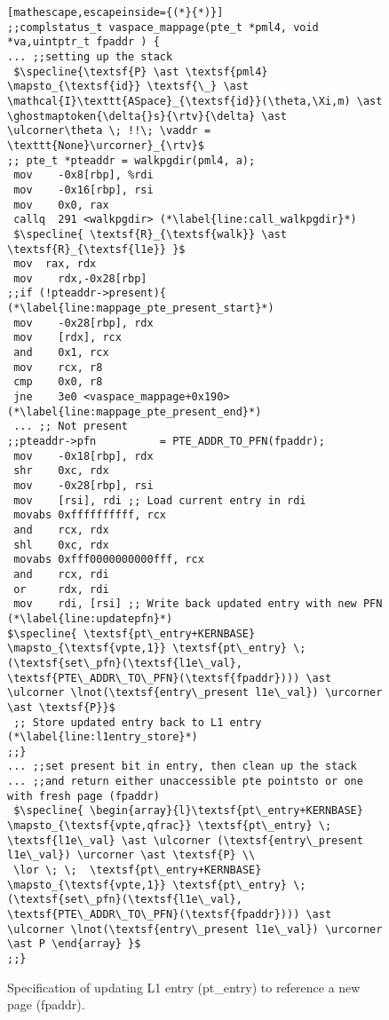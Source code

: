 \begin{figure}\footnotesize
  \begin{lstlisting}[mathescape,escapeinside={(*}{*)}]
;;complstatus_t vaspace_mappage(pte_t *pml4, void *va,uintptr_t fpaddr ) {
... ;;setting up the stack      
 $\specline{\textsf{P} \ast \textsf{pml4} \mapsto_{\textsf{id}} \textsf{\_} \ast \mathcal{I}\texttt{ASpace}_{\textsf{id}}(\theta,\Xi,m) \ast \ghostmaptoken{\delta{}s}{\rtv}{\delta} \ast \ulcorner\theta \; !!\; \vaddr = \texttt{None}\urcorner}_{\rtv}$      
;; pte_t *pteaddr = walkpgdir(pml4, a);
 mov    -0x8[rbp], %rdi
 mov    -0x16[rbp], rsi
 mov    0x0, rax
 callq  291 <walkpgdir> (*\label{line:call_walkpgdir}*)
 $\specline{ \textsf{R}_{\textsf{walk}} \ast \textsf{R}_{\textsf{l1e}} }$
 mov  rax, rdx
 mov    rdx,-0x28[rbp]
;;if (!pteaddr->present){ (*\label{line:mappage_pte_present_start}*)
 mov    -0x28[rbp], rdx
 mov    [rdx], rcx
 and    0x1, rcx
 mov    rcx, r8
 cmp    0x0, r8
 jne    3e0 <vaspace_mappage+0x190> (*\label{line:mappage_pte_present_end}*)
 ... ;; Not present
;;pteaddr->pfn          = PTE_ADDR_TO_PFN(fpaddr);
 mov    -0x18[rbp], rdx
 shr    0xc, rdx
 mov    -0x28[rbp], rsi
 mov    [rsi], rdi ;; Load current entry in rdi
 movabs 0xffffffffff, rcx
 and    rcx, rdx
 shl    0xc, rdx
 movabs 0xfff0000000000fff, rcx
 and    rcx, rdi
 or     rdx, rdi
 mov    rdi, [rsi] ;; Write back updated entry with new PFN (*\label{line:updatepfn}*)
$\specline{ \textsf{pt\_entry+KERNBASE} \mapsto_{\textsf{vpte,1}} \textsf{pt\_entry} \; (\textsf{set\_pfn}(\textsf{l1e\_val}, \textsf{PTE\_ADDR\_TO\_PFN}(\textsf{fpaddr}))) \ast  \ulcorner \lnot(\textsf{entry\_present l1e\_val}) \urcorner \ast \textsf{P}}$
 ;; Store updated entry back to L1 entry (*\label{line:l1entry_store}*)
;;}
... ;;set present bit in entry, then clean up the stack
... ;;and return either unaccessible pte pointsto or one with fresh page (fpaddr)
 $\specline{ \begin{array}{l}\textsf{pt\_entry+KERNBASE} \mapsto_{\textsf{vpte,qfrac}} \textsf{pt\_entry} \; \textsf{l1e\_val} \ast \ulcorner (\textsf{entry\_present l1e\_val}) \urcorner \ast \textsf{P} \\
 \lor \; \;  \textsf{pt\_entry+KERNBASE} \mapsto_{\textsf{vpte,1}} \textsf{pt\_entry} \; (\textsf{set\_pfn}(\textsf{l1e\_val}, \textsf{PTE\_ADDR\_TO\_PFN}(\textsf{fpaddr}))) \ast  \ulcorner \lnot(\textsf{entry\_present l1e\_val}) \urcorner \ast P \end{array} }$
;;}
\end{lstlisting}
\vspace{-1em}
  \caption{Specification of updating L1 entry (\textsf{pt\_entry}) to reference a new page (\textsf{fpaddr}).}
\label{fig:mapping_code}
\end{figure}


